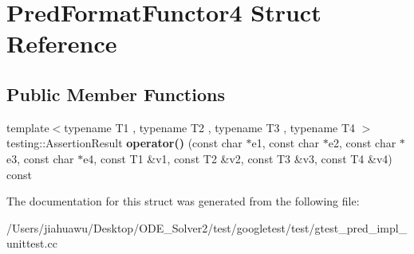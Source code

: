 \hypertarget{struct_pred_format_functor4}{}\section{Pred\+Format\+Functor4 Struct Reference}
\label{struct_pred_format_functor4}
\subsection*{Public Member Functions}
\begin{DoxyCompactItemize}
\item 
\mbox{\label{struct_pred_format_functor4_a97061d2b9eadf357f4e50a75f5a9af5b}} 
{\footnotesize template$<$typename T1 , typename T2 , typename T3 , typename T4 $>$ }\\testing\+::\+Assertion\+Result {\bfseries operator()} (const char $\ast$e1, const char $\ast$e2, const char $\ast$e3, const char $\ast$e4, const T1 \&v1, const T2 \&v2, const T3 \&v3, const T4 \&v4) const
\end{DoxyCompactItemize}


The documentation for this struct was generated from the following file\+:\begin{DoxyCompactItemize}
\item 
/\+Users/jiahuawu/\+Desktop/\+O\+D\+E\+\_\+\+Solver2/test/googletest/test/gtest\+\_\+pred\+\_\+impl\+\_\+unittest.\+cc\end{DoxyCompactItemize}
